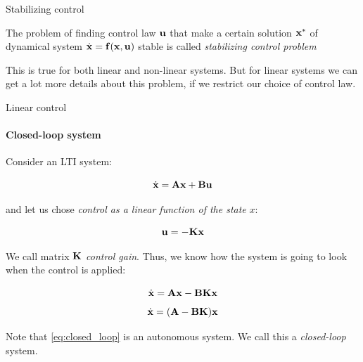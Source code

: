 \documentclass{beamer}
\begin{document}
\begin{frame}{Stabilizing control}
\begin{flushleft}

\begin{definition}
The problem of finding control law $\mathbf{u}$ that make a certain solution $\mathbf{x}^*$ of dynamical system $\dot{\mathbf{x}} = \mathbf{f}(\mathbf{x}, \mathbf{u})$ stable is called \emph{stabilizing control problem}
\end{definition}

\bigskip

This is true for both linear and non-linear systems. But for linear systems we can get a lot more details about this problem, if we restrict our choice of control law.



\end{flushleft}
\end{frame}



\begin{frame}{Linear control}
\framesubtitle{Closed-loop system}
\begin{flushleft}

Consider an LTI system:

\begin{equation}
    \dot{\mathbf{x}} = \mathbf{A}\mathbf{x} + \mathbf{B}\mathbf{u}
\end{equation}

and let us chose \emph{control as a linear function of the state} $x$:

\begin{equation}
    \mathbf{u} = -\mathbf{K}\mathbf{x}
\end{equation}

We call matrix $\mathbf{K}$ \emph{control gain}. Thus, we know how the system is going to look when the control is applied:

\begin{equation}
    \dot{\mathbf{x}} = \mathbf{A}\mathbf{x} - \mathbf{B}\mathbf{K}\mathbf{x}
\end{equation}
\begin{equation}
\label{eq:closed_loop}
    \dot{\mathbf{x}} = (\mathbf{A} - \mathbf{B}\mathbf{K})\mathbf{x}
\end{equation}

Note that \eqref{eq:closed_loop} is an autonomous system. We call this a \emph{closed-loop} system.

\end{flushleft}
\end{frame}
\end{document}
